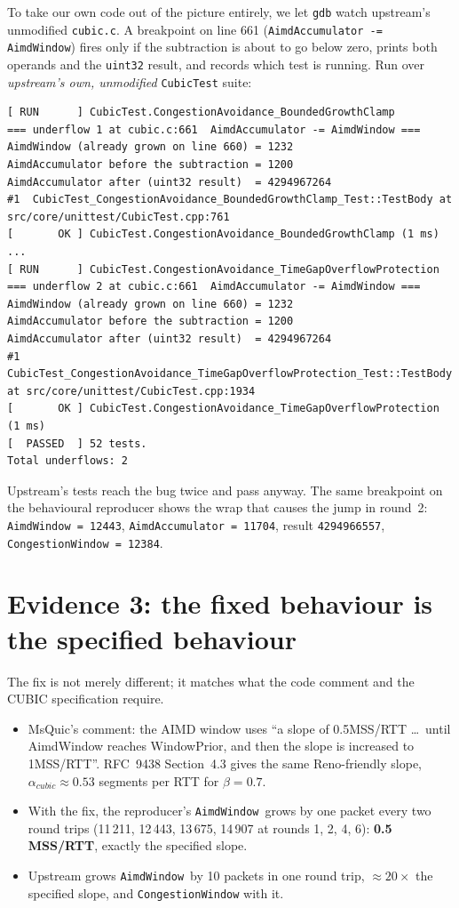 \documentclass[11pt,a4paper]{article}
\newcommand{\aw}{\texttt{AimdWindow}}
\begin{document}
To take our own code out of the picture entirely, we let \texttt{gdb} watch
upstream's unmodified \texttt{cubic.c}. A breakpoint on line 661
(\texttt{AimdAccumulator -= AimdWindow}) fires only if the subtraction is
about to go below zero, prints both operands and the \texttt{uint32} result,
and records which test is running. Run over \emph{upstream's own, unmodified}
\texttt{CubicTest} suite:
\begin{lstlisting}[style=out]
[ RUN      ] CubicTest.CongestionAvoidance_BoundedGrowthClamp
=== underflow 1 at cubic.c:661  AimdAccumulator -= AimdWindow ===
AimdWindow (already grown on line 660) = 1232
AimdAccumulator before the subtraction = 1200
AimdAccumulator after (uint32 result)  = 4294967264
#1  CubicTest_CongestionAvoidance_BoundedGrowthClamp_Test::TestBody at src/core/unittest/CubicTest.cpp:761
[       OK ] CubicTest.CongestionAvoidance_BoundedGrowthClamp (1 ms)
...
[ RUN      ] CubicTest.CongestionAvoidance_TimeGapOverflowProtection
=== underflow 2 at cubic.c:661  AimdAccumulator -= AimdWindow ===
AimdWindow (already grown on line 660) = 1232
AimdAccumulator before the subtraction = 1200
AimdAccumulator after (uint32 result)  = 4294967264
#1  CubicTest_CongestionAvoidance_TimeGapOverflowProtection_Test::TestBody at src/core/unittest/CubicTest.cpp:1934
[       OK ] CubicTest.CongestionAvoidance_TimeGapOverflowProtection (1 ms)
[  PASSED  ] 52 tests.
Total underflows: 2
\end{lstlisting}
Upstream's tests reach the bug twice and pass anyway. The same breakpoint on
the behavioural reproducer shows the wrap that causes the jump in round~2:
\texttt{AimdWindow = 12443}, \texttt{AimdAccumulator = 11704}, result
\texttt{4294966557}, \texttt{CongestionWindow = 12384}.

\section{Evidence 3: the fixed behaviour is the specified behaviour}

The fix is not merely different; it matches what the code comment and the
CUBIC specification require.
\begin{itemize}
  \item MsQuic's comment: the AIMD window uses ``a slope of 0.5MSS/RTT \ldots\
        until AimdWindow reaches WindowPrior, and then the slope is increased
        to 1MSS/RTT''. RFC~9438 Section~4.3 gives the same Reno-friendly
        slope, $\alpha_{\mathit{cubic}} \approx 0.53$ segments per RTT for
        $\beta = 0.7$.
  \item With the fix, the reproducer's \aw\ grows by one packet every two
        round trips (11\,211, 12\,443, 13\,675, 14\,907 at rounds 1, 2, 4, 6):
        \textbf{0.5 MSS/RTT}, exactly the specified slope.
  \item Upstream grows \aw\ by 10 packets in one round trip, $\approx 20\times$
        the specified slope, and \texttt{CongestionWindow} with it.
\end{itemize}
\end{document}
